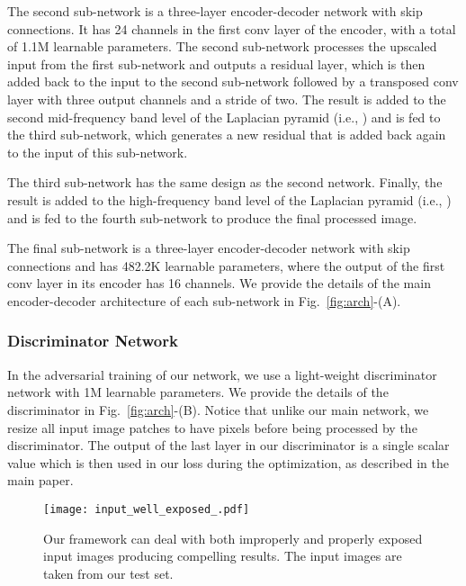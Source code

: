 \documentclass[final]{cvpr}
\begin{document}
The second sub-network is a three-layer encoder-decoder network with skip connections. It has 24 channels in the first conv layer of the encoder, with a total of 1.1M learnable parameters. The second sub-network processes the upscaled input from the first sub-network and outputs a residual layer, which is then added back to the input to the second sub-network followed by a  transposed conv layer with three output channels and a stride of two. The result is added to the second mid-frequency band level of the Laplacian pyramid (i.e., ) and is fed to the third sub-network, which generates a new residual that is added back again to the input of this sub-network. 

The third sub-network has the same design as the second network.  Finally, the result is added to the high-frequency band level of the Laplacian pyramid (i.e., ) and is fed to the fourth sub-network to produce the final processed image. 


The final sub-network is a three-layer encoder-decoder network with skip connections and has 482.2K learnable parameters, where the output of the first conv layer in its encoder has 16 channels. We provide the details of the main encoder-decoder architecture of each sub-network in Fig.\ \ref{fig:arch}-(A).







\subsubsection{Discriminator Network}
In the adversarial training of our network, we use a light-weight discriminator network with 1M learnable parameters. We provide the details of the discriminator in Fig.\ \ref{fig:arch}-(B). Notice that unlike our main network, we resize all input image patches to have  pixels before being processed by the discriminator. The output of the last layer in our discriminator is a single scalar value which is then used in our loss during the optimization, as described in the main paper.




 \begin{figure*}[t]
 \centering
 \texttt{[image: input\_well\_exposed\_.pdf]}
 \vspace{-2mm}
 \caption{Our framework can deal with both improperly and properly exposed input images producing compelling results. The input images are taken from our test set.\vspace{-2mm}}
 \label{fig:input_well_exposed}
 \end{figure*}
 
\end{document}
